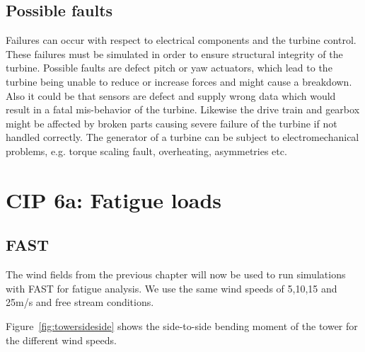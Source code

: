 \documentclass[10pt]{article}
\begin{document}
\subsection{Possible faults}
Failures can occur with respect to electrical components and the turbine control. These failures must be simulated in order to ensure structural integrity of the turbine. Possible faults are defect pitch or yaw actuators, which lead to the turbine being unable to reduce or increase forces and might cause a breakdown. Also it could be that sensors are defect and supply wrong data which would result in a fatal mis-behavior of the turbine. 
Likewise the drive train and gearbox might be affected by broken parts causing severe failure of the turbine if not handled correctly. The generator of a turbine can be subject to electromechanical problems, e.g. torque scaling fault, overheating, asymmetries etc.

\section{CIP 6a: Fatigue loads}
\subsection{FAST}
The wind fields from the previous chapter will now be used to run simulations with FAST for fatigue analysis.
We use the same wind speeds of 5,10,15 and 25m/s and free stream conditions. 

Figure~\ref{fig:towersideside} shows the side-to-side bending moment of the tower for the different wind speeds.
\end{document}
